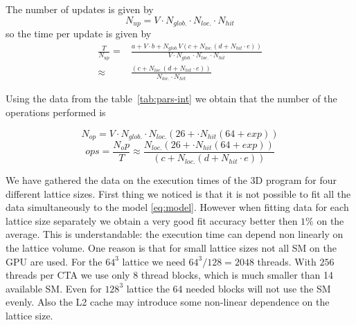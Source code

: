 \documentclass[a4paper]{llncs}
\begin{document}
The number of updates is given by
\begin{equation}
N_{up} = V \cdot N_{glob.} \cdot N_{loc.} \cdot N_{hit}
\end{equation}
so the time per update is given by
\begin{equation}\begin{split}
\frac{T}{N_{up}} = &
\frac{ a + V \cdot b + N_{glob.}
       V \left(c + N_{loc.}\left(d + N_{hit}\cdot e\right)\right) }
     { V\cdot N_{glob.}\cdot N_{loc.}\cdot N_{hit} }\\
\approx&
\frac{ \left(c + N_{loc.}\left(d + N_{hit}\cdot e\right)\right) }
     { N_{loc.}\cdot N_{hit} }
\end{split}
\end{equation}

Using the data from the table~\ref{tab:pars-int} we obtain that the number of
the operations performed is

\begin{equation}
N_{op} = V\cdot N_{glob.}\cdot N_{loc.}(26+\cdot N_{hit}(64+exp))
\end{equation}
\begin{equation}
  ops =   \frac{ N_op }{ T }
  \approx \frac{ N_{loc.}(26+\cdot N_{hit}(64+exp)) }
               { \left(c + N_{loc.}\left(d + N_{hit}\cdot e\right)\right) }
\end{equation}

We have gathered the data on the execution times of the 3D program for four
different lattice sizes. First thing we noticed is that it is not possible to
fit all the data simultaneously to the model \eqref{eq:model}. However when
fitting data for each lattice size separately we obtain a very good fit
accuracy better then $1\%$ on the average. This is understandable: the
execution time can depend non linearly on the lattice volume. One reason is
that for small lattice sizes not all SM on the GPU are used. For the $64^3$
lattice we need $64^3/128=2048$ threads. With $256$ threads per CTA we use only
$8$ thread blocks, which is much smaller than 14 available SM. Even for $128^3$
lattice the 64 needed blocks will not use the SM evenly. Also the L2 cache may
introduce some non-linear dependence on the lattice size.
\end{document}
